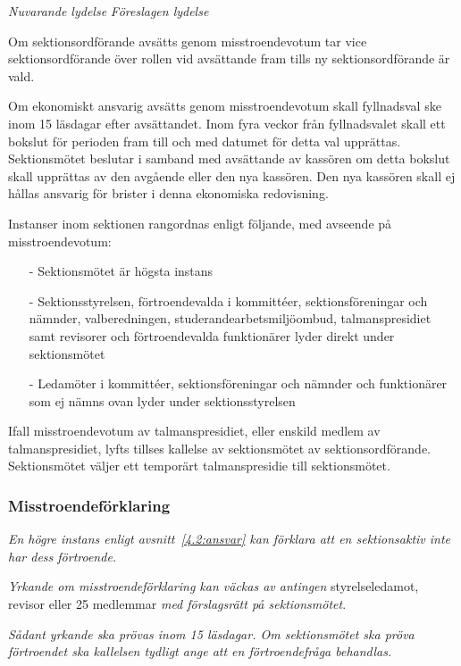 \documentclass{article}
\newenvironment{lydelse}
    {\begin{paracol}{2}%
        \emph{Nuvarande lydelse}%
        \switchcolumn%
        \emph{Föreslagen lydelse}%
    \end{paracol}%
    \begin{enumerate}[label=\thesubsection.\arabic*]%
    \begin{paracol}{2}%
    }{\end{paracol}\end{enumerate}}
\begin{document}
\begin{lydelse}
  	\item Om sektionsordförande avsätts genom misstroendevotum tar vice sektionsordförande över rollen vid avsättande fram tills ny sektionsordförande är vald.

  	\item Om ekonomiskt ansvarig avsätts genom misstroendevotum skall fyllnadsval ske inom 15 läsdagar efter avsättandet. Inom fyra veckor från fyllnadsvalet skall ett bokslut för perioden fram till och med datumet för detta val upprättas. Sektionsmötet beslutar i samband med avsättande av kassören om detta bokslut skall upprättas av den avgående eller den nya kassören. Den nya kassören skall ej hållas  ansvarig för brister i denna ekonomiska redovisning. 

	\item Instanser inom sektionen rangordnas enligt följande, med avseende på misstroendevotum:
  	  \begin{itemize}
  	    \item[-] Sektionsmötet är högsta instans
  		\item[-] Sektionsstyrelsen, förtroendevalda i kommittéer, sektionsföreningar och nämnder, valberedningen, studerandearbetsmiljöombud, talmanspresidiet samt revisorer och förtroendevalda funktionärer lyder direkt under sektionsmötet
  		\item[-] Ledamöter i kommittéer, sektionsföreningar och nämnder och funktionärer som ej nämns ovan lyder under sektionsstyrelsen
  	  \end{itemize}
	
  	\item Ifall misstroendevotum av talmanspresidiet, eller enskild medlem av talmanspresidiet, lyfts tillses kallelse av sektionsmötet av sektionsordförande. Sektionsmötet väljer ett temporärt talmanspresidie till sektionsmötet.

  \switchcolumn
    \subsubsection*{Misstroendeförklaring}
    \item \emph{En högre instans enligt avsnitt~\ref{4.2:ansvar} kan förklara att en sektionsaktiv inte har dess förtroende.}

    \item \emph{Yrkande om misstroendeförklaring kan väckas av antingen}
      styrelseledamot, revisor eller 25 medlemmar \emph{med förslagsrätt på sektionsmötet}.

    \item \emph{Sådant yrkande ska prövas inom 15 läsdagar.
    Om sektionsmötet ska pröva förtroendet ska kallelsen tydligt ange att en förtroendefråga behandlas.} \label{4.3:misstroende}


\end{lydelse}
\end{document}
